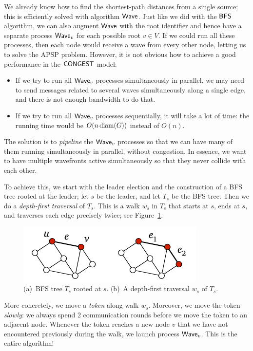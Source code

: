 We already know how to find the shortest-path distances from a single source; this is efficiently solved with algorithm $\textup{\sffamily Wave}$. Just like we did with the $\textup{\sffamily BFS}$ algorithm, we can also augment $\textup{\sffamily Wave}$ with the root identifier and hence have a separate process $\textup{\sffamily Wave}_v$ for each possible root $v \in V$. If we could run all these processes, then each node would receive a wave from every other node, letting us to solve the APSP problem. However, it is not obvious how to achieve a good performance in the $\textup{\sffamily CONGEST}$ model:
\begin{itemize}
    \item If we try to run all $\textup{\sffamily Wave}_v$ processes simultaneously in parallel, we may need to send messages related to several waves simultaneously along a single edge, and there is not enough bandwidth to do that.
    \item If we try to run all $\textup{\sffamily Wave}_v$ processes sequentially, it will take a lot of time: the running time would be $O(n \operatorname{diam}(G))$ instead of $O(n)$.
\end{itemize}
The solution is to \emph{pipeline} the $\textup{\sffamily Wave}_v$ processes so that we can have many of them running simultaneously in parallel, without congestion. In essence, we want to have multiple wavefronts active simultaneously so that they never collide with each other.

To achieve this, we start with the leader election and the construction of a BFS tree rooted at the leader; let $s$ be the leader, and let $T_s$ be the BFS tree. Then we do a \emph{depth-first traversal} of $T_s$. This is a walk $w_s$ in $T_s$ that starts at $s$, ends at $s$, and traverses each edge precisely twice; see Figure~\ref{fig:dfs}.

\begin{figure}
    \centering
    \includegraphics[page=\PDFS]{figs.pdf}
    \caption{(a)~BFS tree $T_s$ rooted at $s$. (b)~A depth-first traversal $w_s$ of $T_s$.}\label{fig:dfs}
\end{figure}

More concretely, we move a \emph{token} along walk $w_s$. Moreover, we move the token \emph{slowly}: we always spend 2 communication rounds before we move the token to an adjacent node. Whenever the token reaches a new node $v$ that we have not encountered previously during the walk, we launch process $\textup{\sffamily Wave}_v$. This is the entire algorithm!

